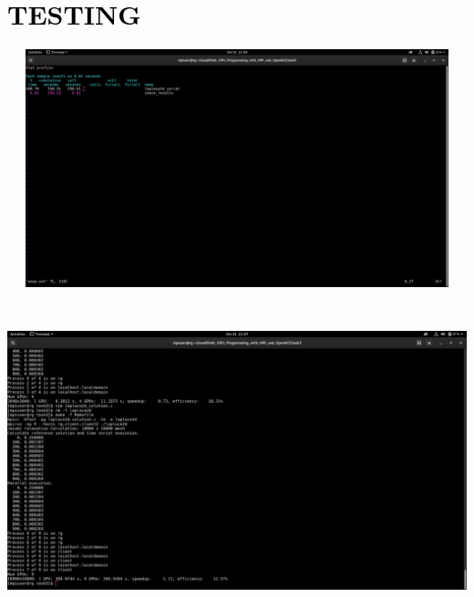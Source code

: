 \documentclass[a4paper]{article}
\begin{document}
\bigskip

\section[]{}

\bigskip

\section[TESTING]{\textcolor{black}{TESTING}}

\bigskip



\begin{center}
\includegraphics[width=19.812cm,height=6.911cm]{csn221Report-img006.jpg}
\end{center}
\begin{center}
\includegraphics[width=18.867cm,height=9.065cm]{csn221Report-img007.jpg}
\end{center}

\bigskip
\end{document}
